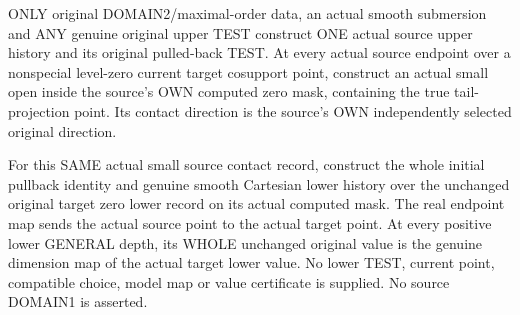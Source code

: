 \begin{theorem}
\label{hir:original-domain-two-zero-own-small-actual-smooth-model-values}
\leanok
ONLY original DOMAIN2/maximal-order data, an actual smooth submersion
and ANY genuine original upper TEST construct ONE actual source upper
history and its original pulled-back TEST. At every actual source
endpoint over a nonspecial level-zero current target cosupport point,
construct an actual small open inside the source's OWN computed zero
mask, containing the true tail-projection point. Its contact direction
is the source's OWN independently selected original direction.

For this SAME actual small source contact record, construct the whole
initial pullback identity and genuine smooth Cartesian lower history
over the unchanged original target zero lower record on its actual
computed mask. The real endpoint map sends the actual source point to
the actual target point. At every positive lower GENERAL depth, its
WHOLE unchanged original value is the genuine dimension map of the
actual target lower value. No lower TEST, current point, compatible
choice, model map or value certificate is supplied. No source DOMAIN1
is asserted.
\end{theorem}
